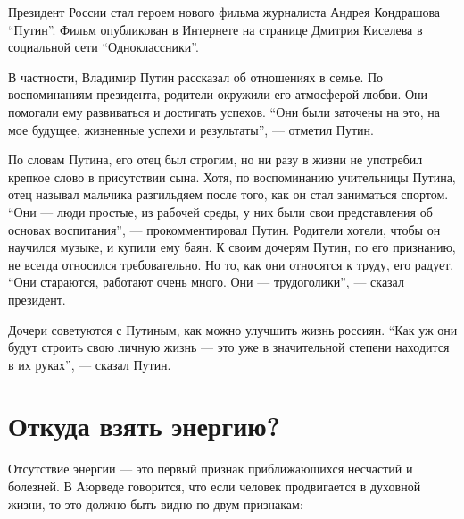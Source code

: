 Президент России стал героем нового фильма журналиста Андрея Кондрашова ``Путин''. Фильм опубликован в Интернете на странице Дмитрия Киселева в социальной сети ``Одноклассники''.

В частности, Владимир Путин рассказал об отношениях в семье. По воспоминаниям президента, родители окружили его атмосферой любви. Они помогали ему развиваться и достигать успехов. ``Они были заточены на это, на мое будущее, жизненные успехи и результаты'', --- отметил Путин.

По словам Путина, его отец был строгим, но ни разу в жизни не употребил крепкое слово в присутствии сына. Хотя, по воспоминанию учительницы Путина, отец называл мальчика разгильдяем после того, как он стал заниматься спортом. ``Они --- люди простые, из рабочей среды, у них были свои представления об основах воспитания'', --- прокомментировал Путин. Родители хотели, чтобы он научился музыке, и купили ему баян.
К своим дочерям Путин, по его признанию, не всегда относился требовательно. Но то, как они относятся к труду, его радует. ``Они стараются, работают очень много. Они --- трудоголики'', --- сказал президент.

Дочери советуются с Путиным, как можно улучшить жизнь россиян. ``Как уж они будут строить свою личную жизнь --- это уже в значительной степени находится в их руках'', --- сказал Путин.




\section{Откуда взять энергию?}
Отсутствие энергии --- это первый признак приближающихся несчастий и болезней. В Аюрведе говорится, что если человек продвигается в духовной жизни, то это должно быть видно по двум признакам:

